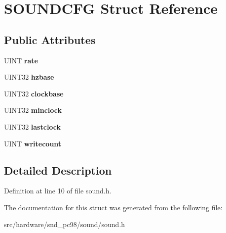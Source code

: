 \hypertarget{structSOUNDCFG}{\section{S\-O\-U\-N\-D\-C\-F\-G Struct Reference}
\label{structSOUNDCFG}
}
\subsection*{Public Attributes}
\begin{DoxyCompactItemize}
\item 
\hypertarget{structSOUNDCFG_af66c7a9b5eb983effa37d4615ea8c1fa}{U\-I\-N\-T {\bfseries rate}}\label{structSOUNDCFG_af66c7a9b5eb983effa37d4615ea8c1fa}

\item 
\hypertarget{structSOUNDCFG_ac03f877657c6cd9c65fcf1332b0105d6}{U\-I\-N\-T32 {\bfseries hzbase}}\label{structSOUNDCFG_ac03f877657c6cd9c65fcf1332b0105d6}

\item 
\hypertarget{structSOUNDCFG_ac00ee13d05ef4c6eb9eac2b8b7242533}{U\-I\-N\-T32 {\bfseries clockbase}}\label{structSOUNDCFG_ac00ee13d05ef4c6eb9eac2b8b7242533}

\item 
\hypertarget{structSOUNDCFG_a9225de0edf888f65fc41cf32717a836f}{U\-I\-N\-T32 {\bfseries minclock}}\label{structSOUNDCFG_a9225de0edf888f65fc41cf32717a836f}

\item 
\hypertarget{structSOUNDCFG_a2734d22adc5e34a930c972fff058255c}{U\-I\-N\-T32 {\bfseries lastclock}}\label{structSOUNDCFG_a2734d22adc5e34a930c972fff058255c}

\item 
\hypertarget{structSOUNDCFG_afac6cf4736349d08ce3ae3917514c381}{U\-I\-N\-T {\bfseries writecount}}\label{structSOUNDCFG_afac6cf4736349d08ce3ae3917514c381}

\end{DoxyCompactItemize}


\subsection{Detailed Description}


Definition at line 10 of file sound.\-h.



The documentation for this struct was generated from the following file\-:\begin{DoxyCompactItemize}
\item 
src/hardware/snd\-\_\-pc98/sound/sound.\-h\end{DoxyCompactItemize}

